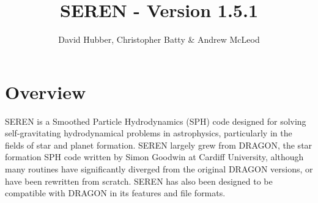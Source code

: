 \documentclass[a4paper]{article}
\newcommand{\NAME}{SEREN }
\begin{document}
\title{\NAME - Version 1.5.1}
\author{David Hubber, Christopher Batty \& Andrew McLeod}

\maketitle

\tableofcontents

\newpage

\section{Overview}
\NAME is a Smoothed Particle Hydrodynamics (SPH) code designed for solving self-gravitating hydrodynamical problems in astrophysics, particularly in the fields of star and planet formation.  \NAME largely grew from DRAGON, the star formation SPH code written by Simon Goodwin at Cardiff University, although many routines have significantly diverged from the original DRAGON versions, or have been rewritten from scratch.  \NAME has also been designed to be compatible with DRAGON in its features and file formats. \newline
\end{document}
